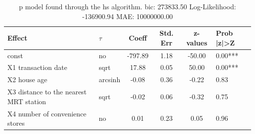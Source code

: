 \begin{table}
	\caption{p model found through the hs algorithm. bic: 273833.50 Log-Likelihood: -136900.94 MAE: 10000000.00}
	\begin{center}
		\begin{tabular}{|l|l|c|c|c|l|}
			\hline
			Effect & $\tau$ & Coeff & Std. Err & z-values & Prob |z|>Z \\
			\hline
			const & no & -797.89 & 1.18 & -50.00 & 0.00*** \\
			\hline
			X1 transaction date & sqrt & 17.88 & 0.05 & 50.00 & 0.00*** \\
			\hline
			X2 house age & arcsinh & -0.08 & 0.36 & -0.22 & 0.83 \\
			\hline
			X3 distance to the nearest MRT station & sqrt & -0.02 & 0.06 & -0.32 & 0.75 \\
			\hline
			X4 number of convenience stores & no & 0.01 & 0.23 & 0.05 & 0.96 \\
			\hline
		\end{tabular}
	\end{center}
\end{table}